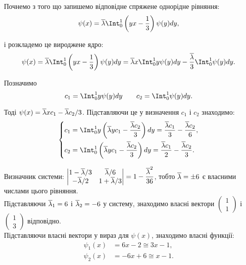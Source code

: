 \begin{solution}
    Почнемо з того що запишемо відповідне спряжене однорідне рівняння:
    \[
        \psi(x) = \conjlambda \Int_0^1 \left(yx - \dfrac13\right) \psi(y) dy,
    \]
    
    і розкладемо це вироджене ядро:
    \[
    \psi(x) = \conjlambda \Int_0^1 \left(yx - \dfrac13\right) \psi(y) dy = \conjlambda x \Int_0^1 y \psi(y) dy - \dfrac {\conjlambda} 3 \Int_0^1 \psi(y) dy.
    \]

    Позначимо
    \[
        c_1 = \Int_0^1 y \psi(y) dy \qquad c_2 = \Int_0^1 \psi(y) dy.
    \]

    Тоді $\psi(x) = \overline{\lambda} x c_1 - \overline{\lambda} c_2 / 3$. Підставляючи це у визначення $c_1$ і $c_2$ знаходимо:
    \begin{equation*}
        \left\{
            \begin{aligned}
                c_1 &= \Int_0^1 y \left( \conjlambda y c_1 - \dfrac {\conjlambda c_2} 3 \right) dy = \dfrac {\conjlambda c_1} 3 - \dfrac{\conjlambda c_2} 6, \\ 
                c_2 &= \Int_0^1 \left( \conjlambda y c_1 - \dfrac {\conjlambda c_2} 3 \right) dy = \dfrac{\conjlambda c_1} 2 - \dfrac{\conjlambda c_2} 3.
            \end{aligned}
        \right.
    \end{equation*}
    
    Визначник системи: $\begin{vmatrix} 1 - \overline{\lambda} / 3 & \overline{\lambda} / 6 \\ - \overline{\lambda} / 2 & 1 + \overline{\lambda} / 3 \end{vmatrix} = 1 - \dfrac {\overline{\lambda}^2} {36}$, тобто $\overline{\lambda} = \pm 6$ є власними числами цього рівняння. \\
    
    Підставляючи $\overline{\lambda}_1 = 6$ і $\overline{\lambda}_2 = - 6$ у систему, знаходимо власні вектори $\begin{pmatrix} 1 \\ 1 \end{pmatrix}$ і $\begin{pmatrix} 1 \\ 3 \end{pmatrix}$ відповідно. \\
    
    Підставляючи власні вектори у вираз для $\psi(x)$, знаходимо власні функції:
    \begin{equation*}
        \begin{aligned}
            \psi_1(x) &= 6x - 2 \cong 3 x - 1, \\
            \psi_2(x) &= -6 x + 6 \cong x - 1.
        \end{aligned}
    \end{equation*}
    

\end{solution}
